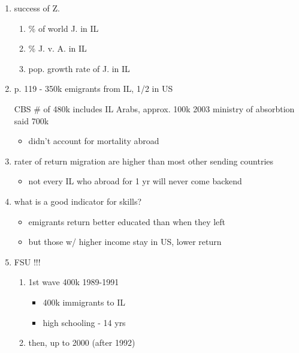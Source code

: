 \documentclass[12pt,twoside]{reedthesis}
\providecommand{\tightlist}{%
  \setlength{\itemsep}{0pt}\setlength{\parskip}{0pt}}
\begin{document}
  \begin{enumerate}
  \def\labelenumi{\arabic{enumi}.}
  \item
    success of Z.
  
    \begin{enumerate}
    \def\labelenumii{\arabic{enumii}.}
    \tightlist
    \item
      \% of world J. in IL
    \item
      \% J. v. A. in IL
    \item
      pop. growth rate of J. in IL
    \end{enumerate}
  \item
    p. 119 - 350k emigrants from IL, 1/2 in US
  
    CBS \# of 480k includes IL Arabs, approx. 100k 2003 ministry of
    absorbtion said 700k
  
    \begin{itemize}
    \tightlist
    \item
      didn't account for mortality abroad
    \end{itemize}
  \item
    rater of return migration are higher than most other sending countries
  
    \begin{itemize}
    \tightlist
    \item
      not every IL who abroad for 1 yr will never come backend
    \end{itemize}
  \item
    what is a good indicator for skills?
  
    \begin{itemize}
    \tightlist
    \item
      emigrants return better educated than when they left
    \item
      but those w/ higher income stay in US, lower return
    \end{itemize}
  \item
    FSU !!!
  
    \begin{enumerate}
    \def\labelenumii{\arabic{enumii}.}
    \tightlist
    \item
      1st wave 400k 1989-1991
  
      \begin{itemize}
      \tightlist
      \item
        400k immigrants to IL
      \item
        high schooling - 14 yrs
      \end{itemize}
    \item
      then, up to 2000 (after 1992)
  

\end{enumerate}
\end{enumerate}
\end{document}
